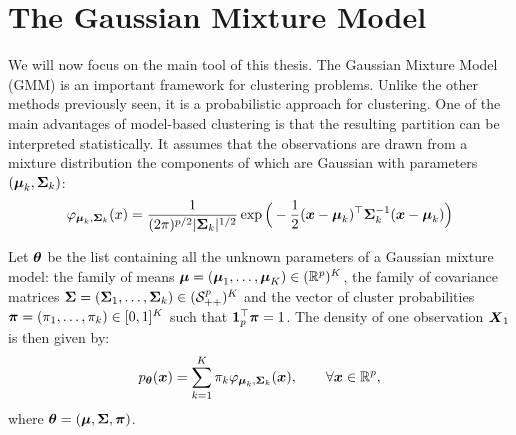 \section{The Gaussian Mixture Model}
We will now focus on the main tool of this thesis. The Gaussian Mixture Model (GMM) is an important framework for clustering problems. Unlike the other methods previously seen, it is a probabilistic approach for clustering. One of the main advantages of model-based clustering is that the resulting partition can be interpreted statistically. It assumes that the observations are drawn from a
mixture distribution the components of which are Gaussian  with parameters $(\boldsymbol\mu_k,\boldsymbol\Sigma_k)$:
\begin{equation}
\varphi_{\boldsymbol\mu_k,\boldsymbol\Sigma_k}(x)=\frac{1}{(2\pi)^{p/2}|\boldsymbol\Sigma_k|^{1/2}} \exp\Big(-\frac{1}{2}(\boldsymbol x-\boldsymbol\mu_k)^\top\boldsymbol\Sigma_k^{-1}(\boldsymbol x-\boldsymbol\mu_k)\Big)
\end{equation}

Let ${\boldsymbol\theta}$ be the list containing all the unknown parameters of a Gaussian mixture model: the family of means $\boldsymbol\mu = (\boldsymbol\mu_1,\ldots,\boldsymbol\mu_K)
\in ({\mathbb R}^p)^K$, the family of covariance matrices $\boldsymbol\Sigma = (\boldsymbol\Sigma_1,\ldots,\boldsymbol\Sigma_k)\in(\mathcal S_{++}^p)^K$ and the vector of cluster probabilities  $\boldsymbol \pi=(\pi_1,\ldots,\pi_k)\in [0,1]^K$ such that $\b1_p^\top\bpi=1$.
The density of one observation $\boldsymbol X_1$ is then given by:
\begin{equation}\label{mixture}
p_{{\boldsymbol\theta}}(\boldsymbol x)=\sum_{k=1}^K\pi_k\varphi_{\boldsymbol\mu_k,\boldsymbol\Sigma_k}(\boldsymbol x),\qquad \forall \boldsymbol x\in{\mathbb R}^p,
\end{equation}
where ${\boldsymbol\theta}=(\boldsymbol\mu,\boldsymbol\Sigma,\boldsymbol \pi)$.


